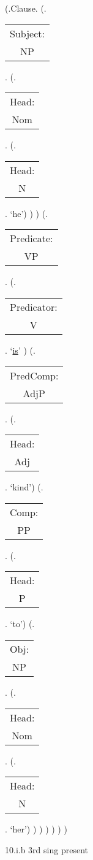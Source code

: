 \documentclass[12pt,letterpaper]{article}
\begin{document}
\begin{figure}
	\begin{center}
		\begin{parsetree}
			(.Clause.
			(.\begin{tabular}{c}Subject:\\NP\end{tabular}.  
			(.\begin{tabular}{c}Head:\\Nom\end{tabular}.
			(.\begin{tabular}{c}Head:\\N\end{tabular}. `he')
			)
			)
			(.\begin{tabular}{c}Predicate:\\VP\end{tabular}.
			(.\begin{tabular}{c}Predicator:\\V\end{tabular}. `\underline{is}' )
			(.\begin{tabular}{c}PredComp:\\AdjP\end{tabular}.
			(.\begin{tabular}{c}Head:\\Adj\end{tabular}. `kind')
			(.\begin{tabular}{c}Comp:\\PP\end{tabular}.
			(.\begin{tabular}{c}Head:\\P\end{tabular}. `to')
			(.\begin{tabular}{c}Obj:\\NP\end{tabular}. 
			(.\begin{tabular}{c}Head:\\Nom\end{tabular}. 
			(.\begin{tabular}{c}Head:\\N\end{tabular}. `her')
			)
			)
			)
			)
			)
			)
			
			
		\end{parsetree}
		\hfill \break \hfill \break
		10.i.b 3rd sing present
	\end{center}
\end{figure}
\end{document}
